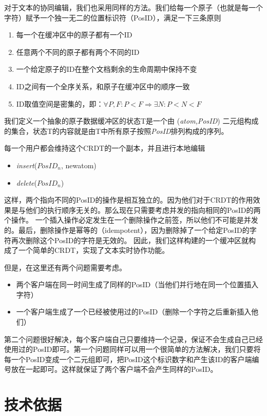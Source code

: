 \documentclass[11pt]{ctexart}
\begin{document}
对于文本的协同编辑，我们也采用同样的方法。我们给每一个原子（也就是每一个字符）赋予一个独一无二的位置标识符（PosID），满足一下三条原则
\begin{enumerate}
	\item 每一个在缓冲区中的原子都有一个ID
	\item 任意两个不同的原子都有两个不同的ID
	\item 一个给定原子的ID在整个文档剩余的生命周期中保持不变
	\item ID之间有一个全序关系，和原子在缓冲区中的顺序一致
	\item ID取值空间是密集的，即：$\forall P, F : P < F \Rightarrow \exists N: P < N < F$
\end{enumerate}
我们定义一个抽象的原子数据缓冲区的状态T是一个由 (\textit{atom,PosID}) 二元组构成的集合，状态T的内容就是由T中所有原子按照\textit{PosID}排列构成的序列。 

每一个用户都会维持这个CRDT的一个副本，并且进行本地编辑
\begin{itemize}
	\item \textit{insert}($\mathit{PosID_{n}}$, newatom)
	\item \textit{delete}($\mathit{PosID_{n}}$)
\end{itemize}
这样，两个指向不同的PosID的操作是相互独立的。因为他们对于CRDT的作用效果是与他们的执行顺序无关的。那么现在只需要考虑并发的指向相同的PosID的两个操作。
一个插入操作必定发生在一个删除操作之前签，所以他们不可能是并发的。最后，删除操作是幂等的（idempotent），因为删除掉了一个给定PosID的字符再次删除这个PosID的字符是无效的。
因此，我们这样构建的一个缓冲区就构成了一个简单的CRDT，实现了文本实时协作功能。

但是，在这里还有两个问题需要考虑。
\begin{itemize}
	\item 两个客户端在同一时间生成了同样的PosID（当他们并行地在同一个位置插入字符）
	\item 一个客户端生成了一个已经被使用过的PosID（删除一个字符之后重新插入他们）
\end{itemize}

第二个问题很好解决，每个客户端自己只要维持一个记录，保证不会生成自己已经使用过的PosID即可。第一个问题同样可以用一个很简单的方法解决，我们只要将每一个PosID变成一个二元组即可，把PosID这个标识数字和产生该ID的客户端编号放在一起即可。这样就保证了两个客户端不会产生同样的PosID。

\section{技术依据}
\end{document}
